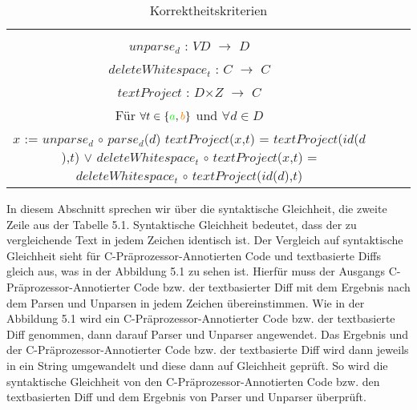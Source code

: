 \begin{table}[H]
\begin{center}
\begin{tabular}{ c||c|c|c| }
{				$parse_d$ : $D$ $\rightarrow$ $VD$\\
				$unparse_d$ : $VD$ $\rightarrow$ $D$\\
				$deleteWhitespace_t$ : $C$ $\rightarrow$ $C$\\
				$textProject$ : $D$$\times$$Z$ $\rightarrow$ $C$\\
				Für $\forall t \in \{\textcolor{green}{a},\textcolor{orange}{b}\}$ und $\forall d \in D$\\
				$x$ := $unparse_d$ $\circ$ $parse_d$($d$)
				$textProject$($x$,$t$) = $textProject$($id$($d$),$t$) $\lor$ $deleteWhitespace_t$ $\circ$ $textProject$($x$,$t$) =  $deleteWhitespace_t$ $\circ$ $textProject$($id$($d$),$t$)
			} \\
			\hline
		\end{tabular}
	\end{center}
	\caption{Korrektheitskriterien}
\end{table}


In diesem Abschnitt sprechen wir über die syntaktische Gleichheit, die zweite Zeile aus der Tabelle 5.1. Syntaktische Gleichheit bedeutet, dass der zu vergleichende Text in jedem Zeichen identisch ist. Der Vergleich auf syntaktische Gleichheit sieht für C-Präprozessor-Annotierten Code und textbasierte Diffs gleich aus, was in der Abbildung 5.1 zu sehen ist. Hierfür muss der Ausgangs C-Präprozessor-Annotierter Code bzw. der textbasierter Diff mit dem Ergebnis nach dem Parsen und Unparsen in jedem Zeichen übereinstimmen. Wie in der Abbildung 5.1 wird ein C-Präprozessor-Annotierter Code bzw. der textbasierte Diff genommen, dann darauf Parser und Unparser angewendet. Das Ergebnis und der C-Präprozessor-Annotierter Code bzw. der textbasierte Diff wird dann jeweils in ein String umgewandelt und diese dann auf Gleichheit geprüft. So wird die syntaktische Gleichheit von den C-Präprozessor-Annotierten Code bzw. den textbasierten Diff und dem Ergebnis von Parser und Unparser überprüft.

